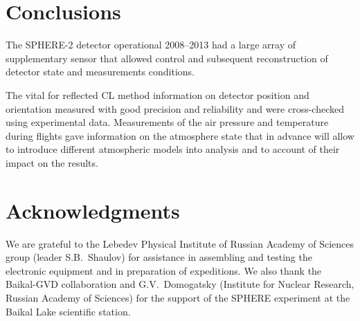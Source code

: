 \documentclass[final,5p,times,twocolumn]{elsarticle}
\begin{document}

\section{Conclusions \label{sect:conclusions}}
The SPHERE-2 detector operational 2008--2013 had a large array of supplementary sensor that allowed control and subsequent reconstruction of detector state and measurements conditions. 

The vital for reflected CL method information on detector position and orientation measured with good precision and reliability and were cross-checked using experimental data.
Measurements of the air pressure and temperature during flights gave information on the atmosphere state that in advance will allow to introduce different atmospheric models into analysis and to account of their impact on the results.

  
\section{Acknowledgments}
We are grateful to the Lebedev Physical Institute of Russian Academy of Sciences group (leader S.B.~Shaulov) for assistance in assembling and testing the electronic equipment and in preparation of expeditions. We also thank the Baikal-GVD collaboration and G.V.~Domogatsky (Institute for Nuclear Research, Russian Academy of Sciences) for the support of the SPHERE experiment at the Baikal Lake scientific station.


\end{document}
